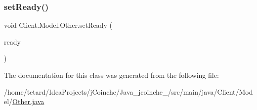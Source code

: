 \mbox{\label{classClient_1_1Model_1_1Other_a46277632c220da183bbcde7e27688456}} 
\subsubsection{\texorpdfstring{set\+Ready()}{setReady()}}
{\footnotesize\ttfamily void Client.\+Model.\+Other.\+set\+Ready (\begin{DoxyParamCaption}\item[{\mbox{\hyperlink{enumClient_1_1Model_1_1ReadyState}{Ready\+State}}}]{ready }\end{DoxyParamCaption})\hspace{0.3cm}{\ttfamily [inline]}}



The documentation for this class was generated from the following file\+:\begin{DoxyCompactItemize}
\item 
/home/tetard/\+Idea\+Projects/j\+Coinche/\+Java\+\_\+jcoinche\+\_/src/main/java/\+Client/\+Model/\mbox{\hyperlink{Other_8java}{Other.\+java}}\end{DoxyCompactItemize}
